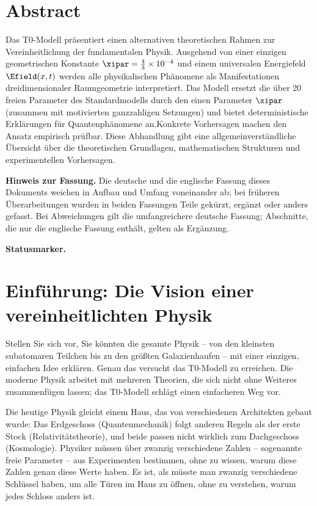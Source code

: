 


	
\section*{Abstract}
		\noindent Das T0-Modell präsentiert einen alternativen theoretischen Rahmen zur Vereinheitlichung der fundamentalen Physik. Ausgehend von einer einzigen geometrischen Konstante $\xipar = \frac{4}{3} \times 10^{-4}$ und einem universalen Energiefeld $\Efield(x,t)$ werden alle physikalischen Phänomene als Manifestationen dreidimensionaler Raumgeometrie interpretiert. Das Modell ersetzt die über 20 freien Parameter des Standardmodells durch den einen Parameter $\xipar$ (zusammen mit motivierten ganzzahligen Setzungen) und bietet deterministische Erklärungen für Quantenphänomene an.Konkrete Vorhersagen machen den Ansatz empirisch prüfbar. Diese Abhandlung gibt eine allgemeinverständliche Übersicht über die theoretischen Grundlagen, mathematischen Strukturen und experimentellen Vorhersagen.

	\medskip\noindent\textbf{Hinweis zur Fassung.} Die deutsche und die englische Fassung dieses Dokuments weichen in Aufbau und Umfang voneinander ab; bei früheren Überarbeitungen wurden in beiden Fassungen Teile gekürzt, ergänzt oder anders gefasst. Bei Abweichungen gilt die umfangreichere deutsche Fassung; Abschnitte, die nur die englische Fassung enthält, gelten als Ergänzung.


	\medskip\noindent\textbf{Statusmarker.}
	

	
	
	\section{Einführung: Die Vision einer vereinheitlichten Physik}
	
	Stellen Sie sich vor, Sie könnten die gesamte Physik -- von den kleinsten subatomaren Teilchen bis zu den größten Galaxienhaufen -- mit einer einzigen, einfachen Idee erklären. Genau das versucht das T0-Modell zu erreichen. Die moderne Physik arbeitet mit mehreren Theorien, die sich nicht ohne Weiteres zusammenfügen lassen; das T0-Modell schlägt einen einfacheren Weg vor.
	
	Die heutige Physik gleicht einem Haus, das von verschiedenen Architekten gebaut wurde: Das Erdgeschoss (Quantenmechanik) folgt anderen Regeln als der erste Stock (Relativitätstheorie), und beide passen nicht wirklich zum Dachgeschoss (Kosmologie). Physiker müssen über zwanzig verschiedene Zahlen -- sogenannte freie Parameter -- aus Experimenten bestimmen, ohne zu wissen, warum diese Zahlen genau diese Werte haben. Es ist, als müsste man zwanzig verschiedene Schlüssel haben, um alle Türen im Haus zu öffnen, ohne zu verstehen, warum jedes Schloss anders ist.
	
